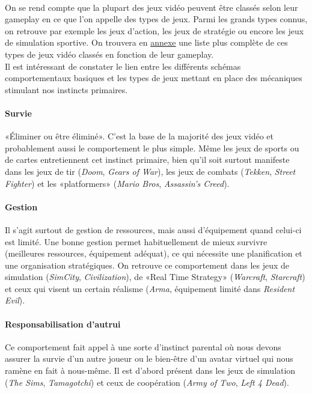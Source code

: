 \paragraph{}On se rend compte que la plupart des jeux vidéo peuvent être classés selon leur gameplay en ce que l'on appelle des types de jeux. Parmi les grands types connus, on retrouve par exemple les jeux d'action, les jeux de stratégie ou encore les jeux de simulation sportive. On trouvera en \href{types_jeux}{annexe} une liste plus complète de ces types de jeux vidéo classés en fonction de leur gameplay. \\

Il est intéressant de constater le lien entre les différents schémas comportementaux basiques et les types de jeux mettant en place des mécaniques stimulant nos instincts primaires.

\paragraph{}
		\paragraph{Survie \\ \quad}
«Éliminer ou être éliminé». C’est la base de la majorité des jeux vidéo et probablement aussi le comportement le plus simple. Même les jeux de sports ou de cartes entretiennent cet instinct primaire, bien qu’il soit surtout manifeste dans les jeux de tir (\emph{Doom}, \emph{Gears of War}), les jeux de combats (\emph{Tekken}, \emph{Street Fighter}) et les «platformers» (\emph{Mario Bros}, \emph{Assassin’s Creed}).
		\paragraph{Gestion \\ \quad}
Il s’agit surtout de gestion de ressources, mais aussi d’équipement quand celui-ci est limité. Une bonne gestion permet habituellement de mieux survivre (meilleures ressources, équipement adéquat), ce qui nécessite une planification et une organisation stratégiques. On retrouve ce comportement dans les jeux de simulation (\emph{SimCity}, \emph{Civilization}), de «Real Time Strategy» (\emph{Warcraft}, \emph{Starcraft}) et ceux qui visent un certain réalisme (\emph{Arma}, équipement limité dans \emph{Resident Evil}).
		\paragraph{Responsabilisation d’autrui \\ \quad}
Ce comportement fait appel à une sorte d’instinct parental où nous devons assurer la survie d’un autre joueur ou le bien-être d’un avatar virtuel qui nous ramène en fait à nous-même. Il est d’abord présent dans les jeux de simulation (\emph{The Sims}, \emph{Tamagotchi}) et ceux de coopération (\emph{Army of Two}, \emph{Left 4 Dead}).
